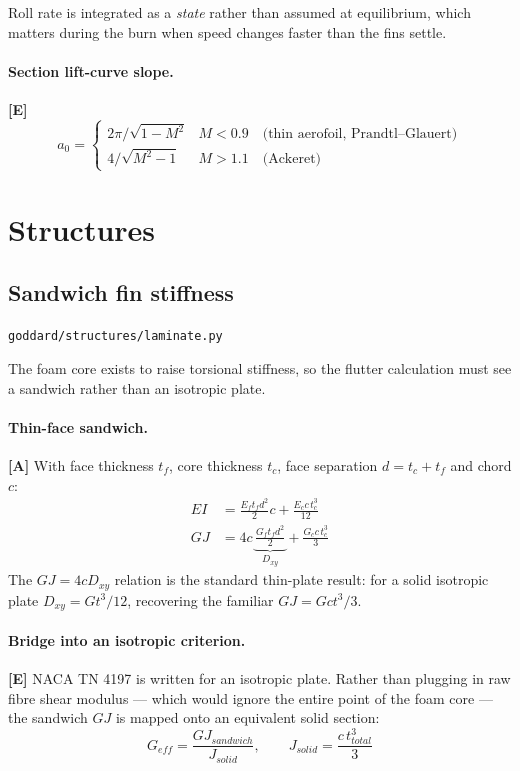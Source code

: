 \documentclass[11pt,a4paper]{article}
\newcommand{\established}{\textcolor{okgreen}{\textbf{[E]}}\xspace}
\newcommand{\approxi}{\textcolor{amber}{\textbf{[A]}}\xspace}
\newcommand{\src}[1]{\hfill{\footnotesize\texttt{#1}}}
\begin{document}
Roll rate is integrated as a \emph{state} rather than assumed at equilibrium,
which matters during the burn when speed changes faster than the fins settle.

\paragraph{Section lift-curve slope.} \established
\begin{equation}
a_0 =
\begin{cases}
2\pi/\sqrt{1-M^2} & M < 0.9 \quad\text{(thin aerofoil, Prandtl--Glauert)}\\
4/\sqrt{M^2-1} & M > 1.1 \quad\text{(Ackeret)}
\end{cases}
\end{equation}

\section{Structures}

\subsection{Sandwich fin stiffness}
\src{goddard/structures/laminate.py}

The foam core exists to raise torsional stiffness, so the flutter calculation
must see a sandwich rather than an isotropic plate.

\paragraph{Thin-face sandwich.} \approxi
With face thickness $t_f$, core thickness $t_c$, face separation
$d = t_c + t_f$ and chord $c$:
\begin{align}
EI &= \frac{E_f t_f d^2}{2}c + \frac{E_c c\, t_c^3}{12} \\
GJ &= 4c\,\underbrace{\frac{G_f t_f d^2}{2}}_{D_{xy}}
      + \frac{G_c c\, t_c^3}{3}
\end{align}
The $GJ = 4cD_{xy}$ relation is the standard thin-plate result: for a solid
isotropic plate $D_{xy} = Gt^3/12$, recovering the familiar $GJ = Gct^3/3$.

\paragraph{Bridge into an isotropic criterion.} \established
NACA TN 4197 is written for an isotropic plate. Rather than plugging in raw
fibre shear modulus --- which would ignore the entire point of the foam core ---
the sandwich $GJ$ is mapped onto an equivalent solid section:
\begin{equation}
\boxed{\ G_{eff} = \frac{GJ_{sandwich}}{J_{solid}}, \qquad
J_{solid} = \frac{c\,t_{total}^3}{3}\ }
\end{equation}
\end{document}
